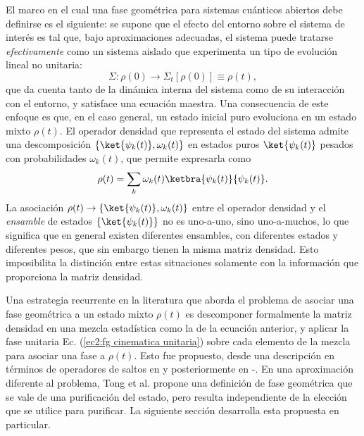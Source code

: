 El marco en el cual una fase geométrica para sistemas cuánticos abiertos debe definirse es el siguiente: se supone que el efecto del entorno sobre el sistema de interés es tal que, bajo aproximaciones adecuadas, el sistema puede tratarse \textit{efectivamente} como un sistema aislado que experimenta un tipo de evolución lineal no unitaria:
\begin{equation}
    \Sigma:\rho(0)\rightarrow\Sigma_t[\rho(0)] \equiv \rho(t),
\end{equation}
que da cuenta tanto de la dinámica interna del sistema como de su interacción con el entorno, y satisface una ecuación maestra. Una consecuencia de este enfoque es que, en el caso general, un estado inicial puro evoluciona en un estado mixto $\rho(t)$. El operador densidad que representa el estado del sistema admite una descomposición $\{ \ket{\psi_k(t)},\omega_k(t)\}$ en estados puros $\ket{\psi_k(t)}$ pesados con probabilidades $\omega_k(t)$, que permite expresarla como
\begin{equation}
    \rho(t)=\sum_k\omega_k(t)\ketbra{\psi_k(t)}{\psi_k(t)}.
\end{equation}
La asociación $\rho(t)\rightarrow \{ \ket{\psi_k(t)},\omega_k(t)\}$ entre el operador densidad y el \textit{ensamble} de estados $\{\ket{\psi_k(t)}\}$ no es uno-a-uno, sino uno-a-muchos, lo que significa que en general existen diferentes ensambles, con diferentes estados y diferentes pesos, que sin embargo tienen la misma matriz densidad. Esto imposibilita la distinción entre estas situaciones solamente con la información que proporciona la matriz densidad.

Una estrategia recurrente en la literatura que aborda el problema de asociar una fase geométrica a un estado mixto $\rho(t)$ es descomponer formalmente la matriz densidad en una mezcla estadística como la de la ecuación anterior, y aplicar la fase unitaria Ec. (\ref{ec2:fg cinematica unitaria}) sobre cada elemento de la mezcla para asociar una fase a $\rho(t)$. Esto fue propuesto, desde una descripción en términos de operadores de saltos en \cite{Carollo2003,Carollo2005} y posteriormente en \cite{Sjoqvist2009}-\cite{Buric2009}. En una aproximación diferente al problema,  Tong et al. \cite{Tong2004}  propone una definición de fase geométrica que se vale de una purificación del estado, pero resulta independiente de la elección que se utilice para purificar. La siguiente sección desarrolla esta propuesta en particular.

